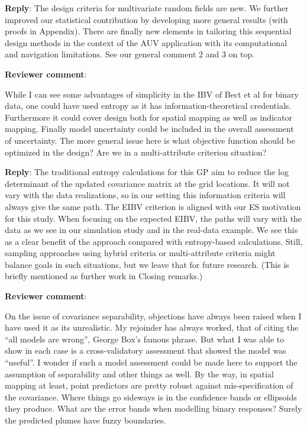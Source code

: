\documentclass[a4paper]{article}
\def\revcom{\textbf{Reviewer comment}}
\def\reply{\textbf{Reply}}
\begin{document}
\begin{answers}
\reply: The design criteria for multivariate random fields are new. We further improved our statistical contribution by developing more general results (with proofs in Appendix). There are finally new elements in tailoring this sequential design methods in the context of the AUV application with its computational and navigation limitations. See our general comment 2 and 3 on top.

\item{\revcom  :}\label{r1c8}

While I can see some advantages of simplicity in the IBV of Bect et al for binary data, one could have used entropy as it has information-theoretical credentials. Furthermore it could cover design both for spatial mapping as well as indicator mapping. Finally model uncertainty could be included in the overall assessment of uncertainty. The more general issue here is what objective function should be optimized in the design? Are we in a multi-attribute criterion situation?

\reply: The traditional entropy calculations for this GP aim to reduce the log determinant of the updated covariance matrix at the grid locations. It will not vary with the data realizations, so in our setting this information criteria will always give the same path. The EIBV criterion is aligned with our ES motivation for this study. When focusing on the expected EIBV, the paths will vary with the data as we see in our simulation study and in the real-data example. We see this as a clear benefit of the approach compared with entropy-based calculations. Still, sampling approaches using hybrid criteria or multi-attribute criteria might balance goals in such situations, but we leave that for future research. (This is briefly mentioned as further work in Closing remarks.) 

\item{\revcom  :}\label{r1c9}

On the issue of covariance separability, objections have always been raised when I have used it as its unrealistic. My rejoinder has always worked, that of citing the “all models are wrong”, George Box’s famous phrase. But what I was able to show in each case is a cross-validatory assessment that showed the model was “useful”. I wonder if such a model assessment could be made here to support the assumption of separability and other things as well. By the way, in spatial mapping at least, point predictors are pretty robust against mis-specification of the covariance. Where things go sideways is in the confidence bands or ellipsoids they produce. What are the error bands when modelling binary responses? Surely the predicted plumes have fuzzy boundaries. 


\end{answers}
\end{document}
